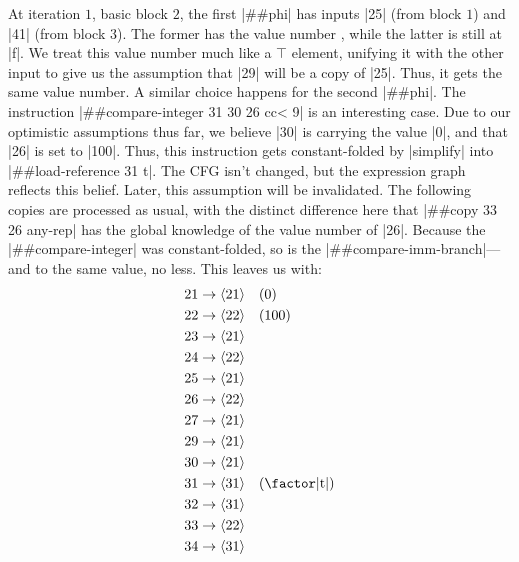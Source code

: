 At iteration $1$, basic block $2$, the first \factor|##phi| has inputs
\factor|25| (from block $1$) and \factor|41| (from block $3$).  The former has
the value number , while the latter is still at \factor|f|.  We treat
this value number much like a $\top$ element, unifying it with the other input
to give us the assumption that \factor|29| will be a copy of \factor|25|.
Thus, it gets the same value number.  A similar choice happens for the second
\factor|##phi|.  The instruction 
%
\factor|##compare-integer 31 30 26 cc< 9|
%
is an interesting case.  Due to our optimistic assumptions thus far, we believe
\factor|30| is carrying the value \factor|0|, and that \factor|26| is set to
\factor|100|.  Thus, this instruction gets constant-folded by \factor|simplify|
into
%
\factor|##load-reference 31 t|.
%
The \gls{CFG} isn't changed, but the expression graph reflects this belief.
Later, this assumption will be invalidated.  The following copies are processed
as usual, with the distinct difference here that 
%
\factor|##copy 33 26 any-rep|
%
has the global knowledge of the value number of \factor|26|.  Because the
\factor|##compare-integer| was constant-folded, so is the
\factor|##compare-imm-branch|---and to the same value, no less.  This leaves us
with:
%
\begin{align*}
  21 &\to \vn{21} \quad (0)                 \\
  22 &\to \vn{22} \quad (100)               \\
  23 &\to \vn{21}                           \\
  24 &\to \vn{22}                           \\
  25 &\to \vn{21}                           \\
  26 &\to \vn{22}                           \\
  27 &\to \vn{21}                           \\
  29 &\to \vn{21}                           \\
  30 &\to \vn{21}                           \\
  31 &\to \vn{31} \quad (\text{\factor|t|}) \\
  32 &\to \vn{31}                           \\
  33 &\to \vn{22}                           \\
  34 &\to \vn{31}
\end{align*}

